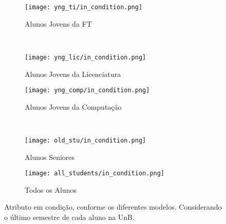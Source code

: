 \clearpage
\begin{figure}[!ht]
    \centering
    \begin{subfigure}[b]{0.48\textwidth}
        \centering
        \texttt{[image: yng\_ti/in\_condition.png]}
        \caption{Alunos Jovens da FT}
    \end{subfigure}
    ~
    \begin{subfigure}[b]{0.48\textwidth}
        \centering
        \texttt{[image: yng\_lic/in\_condition.png]}
        \caption{Alunos Jovens da Licenciatura}
    \end{subfigure}

    \begin{subfigure}[b]{0.48\textwidth}
        \centering
        \texttt{[image: yng\_comp/in\_condition.png]}
        \caption{Alunos Jovens da Computação}
    \end{subfigure}
    ~
    \begin{subfigure}[b]{0.48\textwidth}
        \centering
        \texttt{[image: old\_stu/in\_condition.png]}
        \caption{Alunos Seniores}
    \end{subfigure}

    \begin{subfigure}[b]{0.48\textwidth}
        \centering
        \texttt{[image: all\_students/in\_condition.png]}
        \caption{Todos os Alunos}
    \end{subfigure}
    \caption{Atributo em condição, conforme os diferentes modelos. Considerando o
    último semestre de cada aluno na UnB.}
\end{figure}

